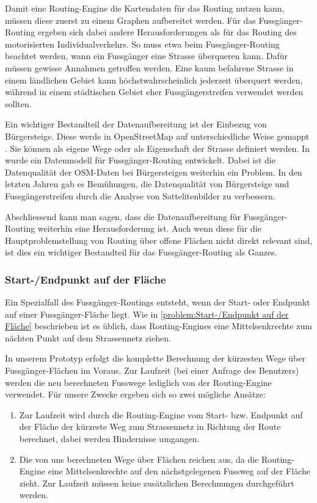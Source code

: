 Damit eine Routing-Engine die Kartendaten für das Routing nutzen kann, müssen diese zuerst zu einem Graphen aufbereitet werden. Für das Fussgänger-Routing ergeben sich dabei andere Herausforderungen als für das Routing des motorisierten Individualverkehrs. So muss etwa beim Fussgänger-Routing beachtet werden, wann ein Fussgänger eine Strasse überqueren kann. Dafür müssen gewisse Annahmen getroffen werden. Eine kaum befahrene Strasse in einem ländlichen Gebiet kann höchstwahrscheinlich jederzeit überquert werden, während in einem städtischen Gebiet eher Fussgängerstreifen verwendet werden sollten.

Ein wichtiger Bestandteil der Datenaufbereitung ist der Einbezug von Bürgersteige. Diese werde in OpenStreetMap auf unterschiedliche Weise gemappt \cite{osm_wiki_sidewalks}. Sie können als eigene Wege oder als Eigenschaft der Strasse definiert werden. In \cite{pedestrian_navigation_lang} wurde ein Datenmodell für Fussgänger-Routing entwickelt. Dabei ist die Datenqualität der \ac{OSM}-Daten bei Bürgersteigen weiterhin ein Problem. In den letzten Jahren gab es Bemühungen, die Datenqualität von Bürgersteige \cite{mapbox_sidewalk_improving} und Fussgängerstreifen \cite{crosswalks_aerial_extraction} durch die Analyse von Sattelitenbilder zu verbessern.

Abschliessend kann man sagen, dass die Datenaufbereitung für Fussgänger-Routing weiterhin eine Herausforderung ist. Auch wenn diese für die Hauptproblemstellung von Routing über offene Flächen nicht direkt relevant sind, ist dies ein wichtiger Bestandteil für das Fussgänger-Routing als Ganzes.


\subsubsection{Start-/Endpunkt auf der Fläche}
\label{subsub:Start-/Endpunkt auf der Fläche}
Ein Spezialfall des Fussgänger-Routings entsteht, wenn der Start- oder Endpunkt auf einer Fussgänger-Fläche liegt. Wie in \ref{problem:Start-/Endpunkt auf der Fläche} beschrieben ist es üblich, dass Routing-Engines eine Mittelsenkrechte zum nächten Punkt auf dem Strassennetz ziehen.

In unserem Prototyp erfolgt die komplette Berechnung der kürzesten Wege über Fussgänger-Flächen im Voraus. Zur Laufzeit (bei einer Anfrage des Benutzers) werden die neu berechneten Fusswege lediglich von der Routing-Engine verwendet. Für unsere Zwecke ergeben sich so zwei mögliche Ansätze:

\begin{enumerate}
    \item Zur Laufzeit wird durch die Routing-Engine vom Start- bzw. Endpunkt auf der Fläche der kürzeste Weg zum Strassennetz in Richtung der Route berechnet, dabei werden Hindernisse umgangen.
    \item Die von uns berechneten Wege über Flächen reichen aus, da die Routing-Engine eine Mittelsenkrechte auf den nächstgelegenen Fussweg auf der Fläche zieht. Zur Laufzeit müssen keine zusätzlichen Berechnungen durchgeführt werden.
\end{enumerate}

